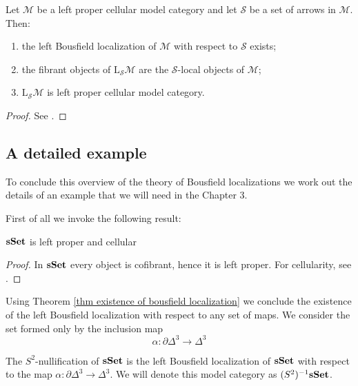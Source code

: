 \begin{refsection}
\begin{thm} \label{thm existence of bousfield localization}
Let $\mathcal M$ be a left proper cellular model category and let $\mathcal S$ be a set of arrows in $\mathcal M$. Then:
\begin{enumerate}
\item the left Bousfield localization of $\mathcal M$ with respect to $\mathcal S$ exists;
\item the fibrant objects of $\mathrm L_{\mathcal S} \mathcal M$ are the $\mathcal S$-local objects of $\mathcal M$;
\item $\mathrm L_{\mathcal S} \mathcal M$ is left proper cellular model category.
\end{enumerate}
\end{thm}

\begin{proof}
See \cite[Theorem 4.1.1]{hirschhorn}.
\end{proof}

\subsection{A detailed example}

To conclude this overview of the theory of Bousfield localizations we work out the details of an example that we will need in the Chapter 3.

First of all we invoke the following result:

\begin{thm}
$\mathbf{sSet}$ is left proper and cellular
\end{thm}

\begin{proof}
In $\mathbf{sSet}$ every object is cofibrant, hence it is left proper. For cellularity, see \cite[Proposition 12.1.4]{hirschhorn}.
\end{proof}

Using Theorem \ref{thm existence of bousfield localization} we conclude the existence of the left Bousfield localization with respect to any set of maps. We consider the set formed only by the inclusion map
\[
\alpha \colon \partial \Delta^3 \to \Delta^3
\]

\begin{defin}
The $S^2$-nullification of $\mathbf{sSet}$ is the left Bousfield localization of $\mathbf{sSet}$ with respect to the map $\alpha \colon \partial \Delta^3 \to \Delta^3$. We will denote this model category as $(S^2)^{-1} \mathbf{sSet}$.
\end{defin}


\end{refsection}
